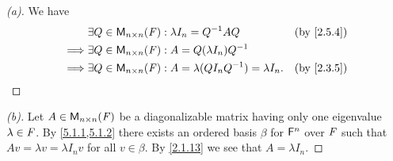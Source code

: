 \begin{proof}[(a)]
  We have
  \begin{align*}
             & \exists Q \in \ms[n][n][\F] : \lambda I_n = Q^{-1} A Q                  &  & \by{2.5.4} \\
    \implies & \exists Q \in \ms[n][n][\F] : A = Q (\lambda I_n) Q^{-1}                                \\
    \implies & \exists Q \in \ms[n][n][\F] : A = \lambda (Q I_n Q^{-1}) = \lambda I_n. &  & \by{2.3.5}
  \end{align*}
\end{proof}

\begin{proof}[(b)]
  Let \(A \in \ms[n][n][\F]\) be a diagonalizable matrix having only one eigenvalue \(\lambda \in \mathit{F}\).
  By \cref{5.1.1,5.1.2} there exists an ordered basis \(\beta\) for \(\mathsf{F}^n\) over \(\mathit{F}\) such that \(Av = \lambda v = \lambda I_n v\) for all \(v \in \beta\).
  By \cref{2.1.13} we see that \(A = \lambda I_n\).
\end{proof}

